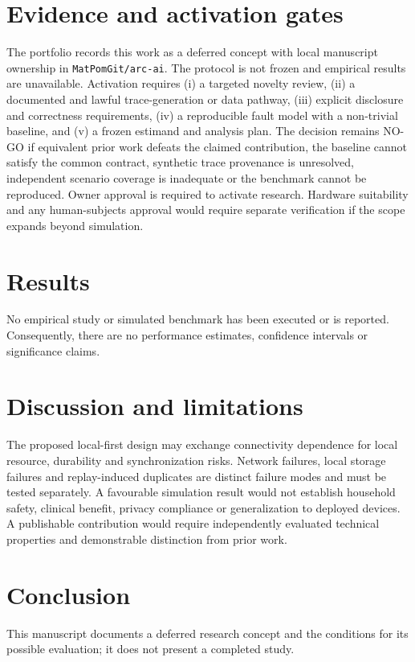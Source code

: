 \documentclass[11pt,a4paper]{article}
\begin{document}
\section{Evidence and activation gates}
The portfolio records this work as a deferred concept with local manuscript ownership in \texttt{MatPomGit/arc-ai}. The protocol is not frozen and empirical results are unavailable. Activation requires (i) a targeted novelty review, (ii) a documented and lawful trace-generation or data pathway, (iii) explicit disclosure and correctness requirements, (iv) a reproducible fault model with a non-trivial baseline, and (v) a frozen estimand and analysis plan. The decision remains NO-GO if equivalent prior work defeats the claimed contribution, the baseline cannot satisfy the common contract, synthetic trace provenance is unresolved, independent scenario coverage is inadequate or the benchmark cannot be reproduced. Owner approval is required to activate research. Hardware suitability and any human-subjects approval would require separate verification if the scope expands beyond simulation.

\section{Results}
No empirical study or simulated benchmark has been executed or is reported. Consequently, there are no performance estimates, confidence intervals or significance claims.

\section{Discussion and limitations}
The proposed local-first design may exchange connectivity dependence for local resource, durability and synchronization risks. Network failures, local storage failures and replay-induced duplicates are distinct failure modes and must be tested separately. A favourable simulation result would not establish household safety, clinical benefit, privacy compliance or generalization to deployed devices. A publishable contribution would require independently evaluated technical properties and demonstrable distinction from prior work.

\section{Conclusion}
This manuscript documents a deferred research concept and the conditions for its possible evaluation; it does not present a completed study.
\end{document}
